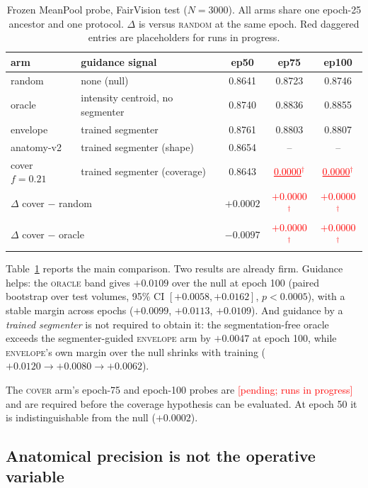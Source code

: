 \documentclass{article}
\newcommand{\ph}[1]{\textcolor{red}{\underline{#1}$^{\dagger}$}}
\newcommand{\phtext}[1]{\textcolor{red}{[#1]}}
\begin{document}
\begin{table}[t]
\centering
\caption{Frozen MeanPool probe, FairVision test ($N{=}3000$). All arms share one
epoch-25 ancestor and one protocol. $\Delta$ is versus \textsc{random} at the
same epoch. Red daggered entries are placeholders for runs in progress.}
\label{tab:main}
\small
\begin{tabular}{llccc}
\toprule
arm & guidance signal & ep50 & ep75 & ep100 \\
\midrule
random           & none (null)                      & 0.8641 & 0.8723 & 0.8746 \\
oracle           & intensity centroid, no segmenter & 0.8740 & 0.8836 & 0.8855 \\
envelope         & trained segmenter                & 0.8761 & 0.8803 & 0.8807 \\
anatomy-v2       & trained segmenter (shape)        & 0.8654 & --     & --     \\
cover $f{=}0.21$ & trained segmenter (coverage)     & 0.8643 & \ph{0.0000} & \ph{0.0000} \\
\midrule
\multicolumn{2}{l}{$\Delta$ cover $-$ random}  & $+0.0002$ & \ph{$+0.0000$} & \ph{$+0.0000$} \\
\multicolumn{2}{l}{$\Delta$ cover $-$ oracle}  & $-0.0097$ & \ph{$+0.0000$} & \ph{$+0.0000$} \\
\bottomrule
\end{tabular}
\end{table}

Table~\ref{tab:main} reports the main comparison. Two results are already firm.
Guidance helps: the \textsc{oracle} band gives $+0.0109$ over the null at epoch
100 (paired bootstrap over test volumes, 95\% CI $[+0.0058,+0.0162]$,
$p<0.0005$), with a stable margin across epochs ($+0.0099$, $+0.0113$,
$+0.0109$). And guidance by a \emph{trained segmenter} is not required to obtain
it: the segmentation-free oracle exceeds the segmenter-guided \textsc{envelope}
arm by $+0.0047$ at epoch 100, while \textsc{envelope}'s own margin over the
null shrinks with training ($+0.0120 \to +0.0080 \to +0.0062$).

The \textsc{cover} arm's epoch-75 and epoch-100 probes are
\phtext{pending; runs in progress} and are required before the coverage
hypothesis can be evaluated. At epoch 50 it is indistinguishable from the null
($+0.0002$).

\subsection{Anatomical precision is not the operative variable}
\end{document}
